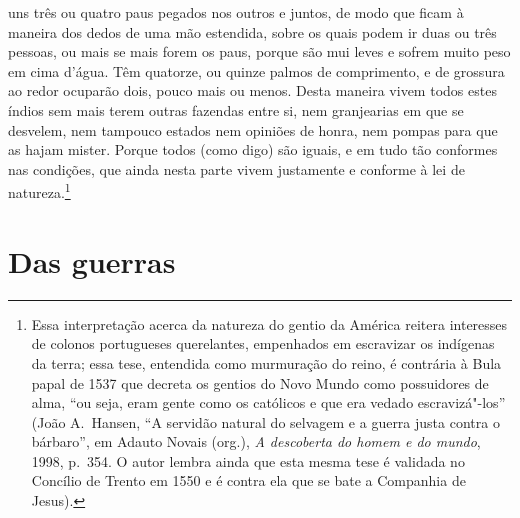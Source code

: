 uns três ou quatro paus pegados nos outros e juntos, de modo que ficam
à maneira dos dedos de uma mão estendida, sobre os quais podem ir duas
ou três pessoas, ou mais se mais forem os paus, porque são mui leves e
sofrem muito peso em cima d'água. Têm quatorze, ou
quinze palmos de comprimento, e de grossura ao redor ocuparão dois, pouco
mais ou menos. Desta maneira vivem todos estes índios sem mais terem			%
outras fazendas entre si, nem granjearias em que se desvelem, nem tampouco
estados nem opiniões de honra, nem pompas para que as hajam
mister. Porque todos (como digo) são iguais, e em tudo tão conformes
nas condições, que ainda nesta parte vivem justamente e conforme à lei		
de natureza.\footnote{ Essa interpretação acerca da natureza do 
gentio da América reitera interesses de colonos portugueses querelantes,
empenhados em escravizar os indígenas da terra; essa tese, entendida como
murmuração do reino, é contrária à Bula papal de 1537 que decreta os gentios do
Novo Mundo como possuidores de alma, ``ou seja, eram gente como os católicos e
que era vedado escravizá"-los'' (João A.~Hansen, ``A servidão natural do selvagem e a guerra  
justa contra o bárbaro'', em Adauto Novais (org.), \textit{A descoberta do homem e do mundo}, 1998, p.~354. O autor lembra ainda que esta mesma tese é validada no  
Concílio de Trento em 1550 e é contra ela que se bate a Companhia de Jesus).} 		%



\chapter[Das guerras]{Das guerras}						  



